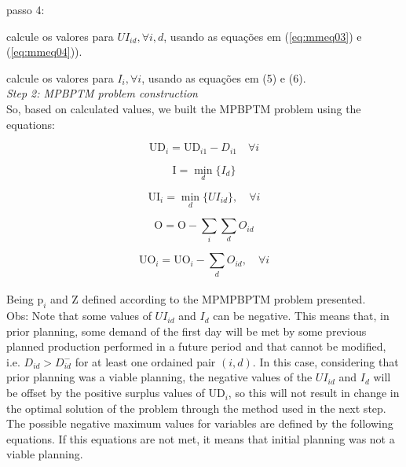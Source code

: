 \documentclass[authoryear,preprint,12pt]{elsarticle}
\begin{document}
passo 4: 

calcule os valores para $UI_{id}, \forall i, d$, usando as equações em (\ref{eq:mmeq03}) e (\ref{eq:mmeq04})).

calcule os valores para $I_{i}, \forall i$, usando as equações em (5) e (6). \\

\emph{Step 2: MPBPTM problem construction} \\

So, based on calculated values, we built the MPBPTM problem using the equations:

\begin{equation}
\textrm{UD}_{i} = \textrm{UD}_{i1} - D_{i1} \quad \forall i
\end{equation}

\begin{equation}
\textrm{I} = \min_{d} \{I_{d}\}
\end{equation}

\begin{equation}
\textrm{UI}_{i} = \min_{d} \{UI_{id}\}, \quad \forall{i}
\end{equation}

\begin{equation}
\textrm{O} = \textrm{O} - \sum_{i}{\sum_{d}{O_{id}}}
\end{equation}

\begin{equation}
\textrm{UO}_{i} = \textrm{UO}_{i} - \sum_{d}{O_{id}}, \quad \forall i
\end{equation} \\

Being $\textrm{p}_{i}$ and $\textrm{Z}$ defined according to the MPMPBPTM problem presented. \\

Obs: Note that some values of $UI_{id}$ and  $I_{d}$ can be negative. This means that, in prior planning, some demand of the first day will be met by some previous planned production performed in a future period and that cannot be modified, i.e. $D_{id} > D_{id}^-$ for at least one ordained pair $(i,d)$. In this case, considering that prior planning was a viable planning, the negative values of the $UI_{id}$ and $I_{d}$ will be offset by the positive surplus values of $\textrm{UD}_{i}$, so this will not result in change in the optimal solution of the problem through the method used in the next step. \\

The possible negative maximum values for variables are defined by the following equations. If this equations are not met, it means that initial planning was not a viable planning.
\end{document}
